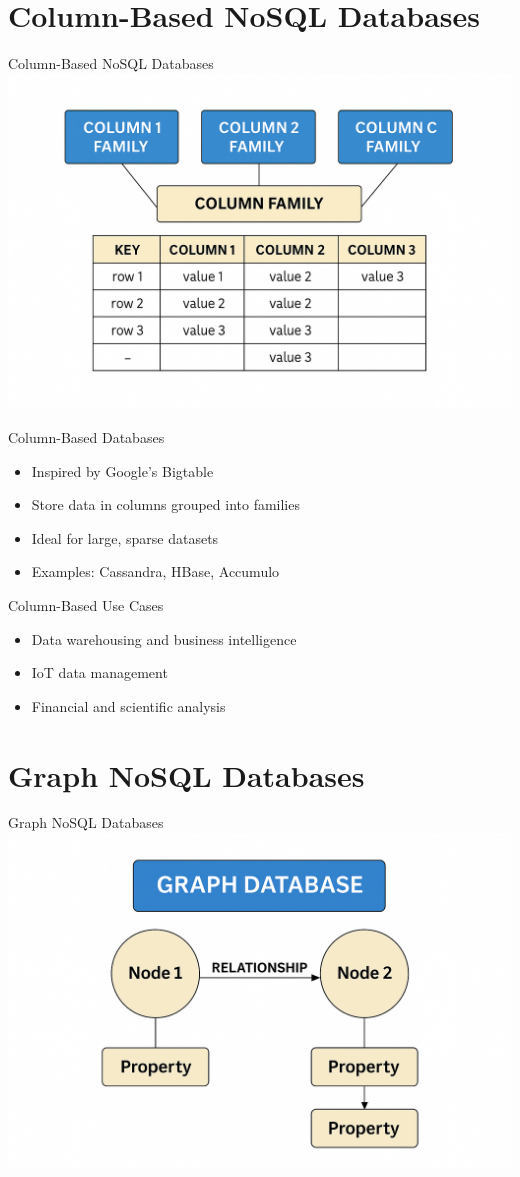 \documentclass[aspectratio=169]{beamer}
\begin{document}
\section{Column-Based NoSQL Databases}

\begin{frame}{\centering Column-Based NoSQL Databases}
\centering
\includegraphics[width=0.6\linewidth]{figures/column_family_diagram}
\end{frame}

\begin{frame}{Column-Based Databases}
\begin{itemize}
    \item Inspired by Google's Bigtable
    \item Store data in columns grouped into families
    \item Ideal for large, sparse datasets
    \item Examples: Cassandra, HBase, Accumulo
\end{itemize}
\end{frame}

\begin{frame}{Column-Based Use Cases}
\begin{itemize}
    \item Data warehousing and business intelligence
    \item IoT data management
    \item Financial and scientific analysis
\end{itemize}
\end{frame}

\section{Graph NoSQL Databases}

\begin{frame}{\centering Graph NoSQL Databases}
\centering
\includegraphics[width=0.6\linewidth]{figures/graph_db_diagram}
\end{frame}
\end{document}
